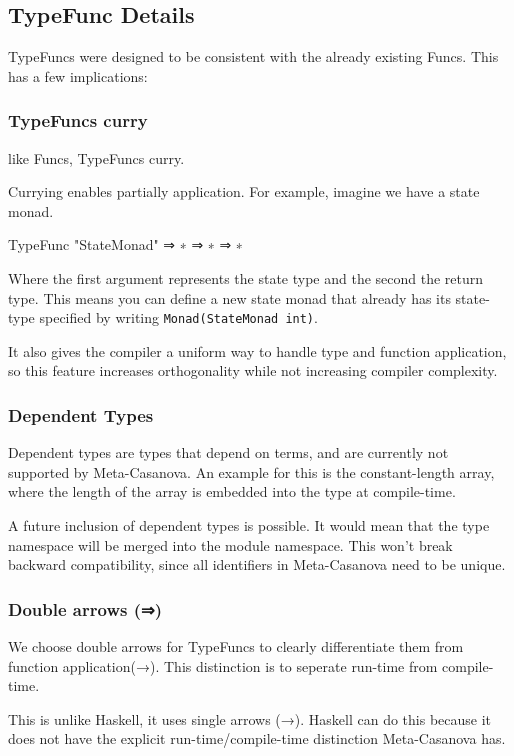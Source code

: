 \subsection{TypeFunc Details}
TypeFuncs were designed to be consistent with the already existing Funcs.
This has a few implications:

\subsubsection*{TypeFuncs curry}
like Funcs, TypeFuncs curry.

Currying enables partially application.
For example, imagine we have a state monad.

\begin{code}
  TypeFunc "StateMonad" ⇒ ∗ ⇒ ∗ ⇒ ∗
\end{code}

\noindent Where the first argument represents the state type and the second the return type.
This means you can define a new state monad that already has its state-type specified by writing \verb|Monad(StateMonad int)|.

It also gives the compiler a uniform way to handle type and function application,
so this feature increases orthogonality while not increasing compiler complexity.

\subsubsection*{Dependent Types}
Dependent types are types that depend on terms, and are currently not supported by Meta-Casanova.
An example for this is the constant-length array, where the length of the array is embedded into the type at compile-time.

A future inclusion of dependent types is possible.
It would mean that the type namespace will be merged into the module namespace.
This won't break backward compatibility, since all identifiers in Meta-Casanova need to be unique.

\subsubsection*{Double arrows (⇒)}
We choose double arrows for TypeFuncs to clearly differentiate them from function application(→).
This distinction is to seperate run-time from compile-time.

This is unlike Haskell, it uses single arrows (→).
Haskell can do this because it does not have the explicit run-time/compile-time distinction Meta-Casanova has.

